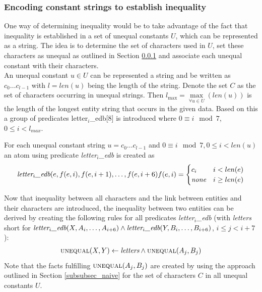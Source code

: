 \documentclass[hyperref,bachelorofscience,fleqn]{cgvpub}
\begin{document}
\subsubsection{Encoding constant strings to establish inequality}\label{subsubsec_encoding}
One way of determining inequality would be to take advantage of the fact that inequality is established in a set of unequal constants \(U\), which can be represented as a string. The idea is to determine the set of characters used in \(U\), set these characters as unequal as outlined in Section \ref{subsubsec_encoding} and associate each unequal constant with their characters.\\

An unequal constant \(u \in U\) can be represented a string and be written as \(c_0 \ldots c_{l - 1}\) with \(l = len(u)\) being the length of the string. Denote the set \(C\) as the set of characters occurring in unequal strings. Then \(l_{\max} = \max\limits_{\forall u \in U}(len(u))\) is the length of the longest entity string that occurs in the given data.
Based on this a group of predicates letter\(_i\)\_edb[8] is introduced where \(0 \equiv i \mod 7\), \(0 \leq i < l_{max} \). 

For each unequal constant string \(u = c_0 \ldots c_{l - 1}\) and \(0 \equiv i \mod 7, 0 \leq i < len(u)\) an atom using predicate \emph{letter\(_i\)\_edb} is created as 
\begin{align}
\begin{split}
\emph{letter}_i\emph{\_edb}(e, f(e, i), f(e, i+1), \ldots, f(e, i+6)
\end{split}
\begin{split}
f(e, i) = 
\begin{cases}
      c_i & i < len(e) \\
      \emph{none} & i \geq len(e)
\end{cases}
\end{split}
\end{align}

Now that inequality between all characters and the link between entities and their characters are introduced, the inequality between two entities can be derived by creating the following rules for all predicates \emph{letter\(_i\)\_edb} (with \emph{letters} short for \(\emph{letter}_i\emph{\_edb}(X, A_i, \ldots, A_{i+6}) \wedge\emph{letter}_i\emph{\_edb}(Y, B_i, \ldots, B_{i+6})\), \(i \leq j < i + 7\)):
\begin{align}
\textsc{unequal}(X, Y) \leftarrow \emph{letters} \wedge \textsc{unequal}(A_j, B_j)
\end{align}
Note that the facts fulfilling \(\textsc{unequal}(A_j, B_j)\) are created by using the approach outlined in Section \ref{subsubsec_naive} for the set of characters \(C\) in all unequal constants \(U\).	
\end{document}
